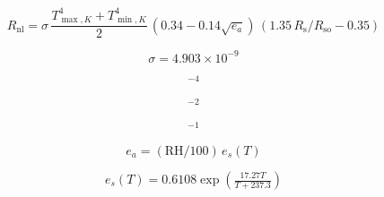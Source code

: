 \documentclass[preview,border=2pt]{standalone}
\begin{document}
\[
R_\mathrm{nl}=\sigma\,\dfrac{T_{\max,K}^4 + T_{\min,K}^4}{2}\,(0.34-0.14\sqrt{e_a})\,(1.35\,R_\mathrm{s}/R_\mathrm{so}-0.35)
\]

\[
\sigma=4.903\times10^{-9}
\]

\[
^{-4}
\]

\[
^{-2}
\]

\[
^{-1}
\]

\[
e_a=(\mathrm{RH}/100)\,e_s(T)
\]

\[
e_s(T)=0.6108\exp\!(\tfrac{17.27T}{T+237.3})
\]
\end{document}
